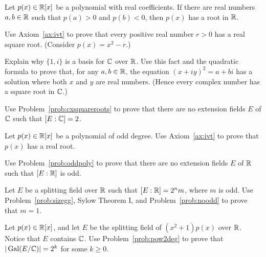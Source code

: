 \begin{axiom}\label{ax:ivt}
    Let $p(x) \in \mathbb{R}[x]$ be a polynomial with real coefficients. If there are real numbers $a,b\in \mathbb{R}$ such that $p(a)>0$ and $p(b)<0$, then $p(x)$ has a root in $\mathbb{R}$.
\end{axiom}

\begin{problem}
    Use Axiom~\ref{ax:ivt} to prove that every positive real number $r>0$ has a real square root. (Consider $p(x) = x^2-r$.)
\end{problem}

\begin{problem}\label{prob:cxsquareroots}
    Explain why $\{1,i\}$ is a basis for $\mathbb{C}$ over $\mathbb{R}$. Use this fact and the quadratic formula to prove that, for any $a,b\in \mathbb{R}$, the equation $(x+iy)^2 = a + bi$ has a solution where both $x$ and $y$ are real numbers. (Hence every complex number has a square root in $\mathbb{C}$.)
\end{problem}

\begin{problem}\label{prob:nodeg2}
Use Problem~\ref{prob:cxsquareroots} to prove that there are no extension fields $E$ of $\mathbb{C}$ such that $[E:\mathbb{C}] = 2$.
\end{problem}

\begin{problem}\label{prob:oddpoly}
    Let $p(x) \in \mathbb{R}[x]$ be a polynomial of odd degree. Use Axiom~\ref{ax:ivt} to prove that $p(x)$ has a real root.
\end{problem}

\begin{problem}\label{prob:noodd}
    Use Problem~\ref{prob:oddpoly} to prove that there are no extension fields $E$ of $\mathbb{R}$ such that $[E:\mathbb{R}]$ is odd.
\end{problem}

\begin{problem}\label{prob:pow2deg}
    Let $E$ be a splitting field over $\mathbb{R}$ such that $[E:\mathbb{R}] = 2^n m$, where $m$ is odd. Use Problem~\ref{prob:sizegg}, Sylow Theorem I, and Problem~\ref{prob:noodd} to prove that $m=1$.
\end{problem}

\begin{problem}\label{prob:pow2ggp}
    Let $p(x) \in \mathbb{R}[x]$, and let $E$ be the splitting field of $(x^2+1)p(x)$ over $\mathbb{R}$. Notice that $E$ contains $\mathbb{C}$. Use Problem~\ref{prob:pow2deg} to prove that $|\operatorname{Gal}(E/\mathbb{C})| = 2^k$ for some $k \geq 0$.
\end{problem}

